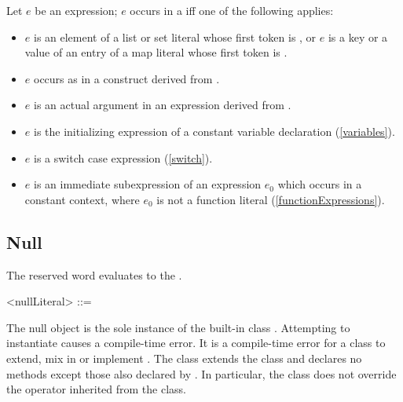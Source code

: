 \documentclass[makeidx]{article}
\begin{document}
{\LMHash{}%
Let $e$ be an expression; $e$ occurs in a
if{}f one of the following applies:


\begin{itemize}
\item $e$ is an element of a list or set literal whose first token is \CONST,
  or $e$ is a key or a value of an entry
  of a map literal whose first token is \CONST.
\item $e$ occurs as  in a construct derived from .
\item $e$ is an actual argument in an expression derived from
  .
\item $e$ is the initializing expression of a constant variable declaration
  (\ref{variables}).
\item $e$ is a switch case expression
  (\ref{switch}).
\item $e$ is an immediate subexpression of
  an expression $e_0$ which occurs in a constant context,
  where $e_0$ is
  not a function literal
  (\ref{functionExpressions}).
\end{itemize}



\subsection{Null}

\LMHash{}%
The reserved word \NULL{} evaluates to the .

\begin{grammar}
<nullLiteral> ::= \NULL{}
\end{grammar}

\LMHash{}%
The null object is the sole instance of the built-in class .
Attempting to instantiate  causes a compile-time error.
It is a compile-time error for a class to extend, mix in or implement .
The  class extends the  class and declares no methods except those also declared by .
In particular, the  class does not override the \lit{==} operator
inherited from the  class.

}
\end{document}
